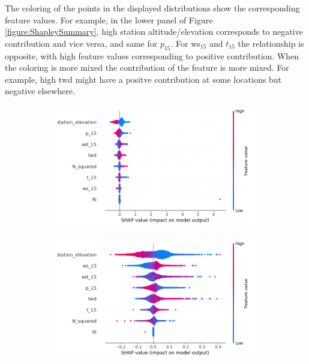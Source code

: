 The coloring of the points in the displayed distributions show the corresponding feature values. For example, in the lower panel of Figure \ref{figure:ShapleySummary}, high station altitude/elevation corresponds to negative contribution and vice versa, and same for $p_{15}$. For ws$_{15}$ and $t_{15}$ the relationship is opposite, with high feature values corresponding to positive contribution. When the coloring is more mixed the contribution of the feature is more mixed. For example, high twd might have a positve contribution at some locations but negative elsewhere.

\begin{figure}
  \centering
  \label{fig:ShapleySummary}
  \begin{subfigure}{0.9\textwidth}
    \includegraphics[width=\textwidth]{Figures/shap_plots/summary_plot.png}
  \end{subfigure}
  \vspace{0.5cm}
  \begin{subfigure}{0.9\textwidth}
    \includegraphics[width=\textwidth]{Figures/shap_plots/summary_plot_190924_.png}

\end{subfigure}
\end{figure}
